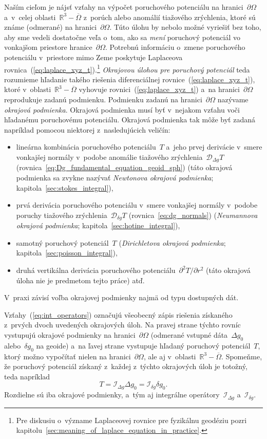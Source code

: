 \documentclass[a4paper, 12pt]{book}
\newcommand{\DIFF}{\mathcal D}
\newcommand{\INT}{\mathcal I}
\begin{document}
Naším cieľom je nájsť vzťahy na výpočet poruchového potenciálu na 
hranici~$\partial \Omega$ a~v~celej oblasti~$\mathbb{R}^3 - \overline{\Omega}$ 
z~porúch alebo anomálií tiažového zrýchlenia, ktoré sú známe (odmerané) na 
hranici~$\partial \Omega$.  Túto úlohu by nebolo možné vyriešiť bez toho, aby 
sme vedeli dostatočne veľa o~tom, ako sa \emph{mení} poruchový potenciál vo 
vonkajšom priestore hranice~$\partial\Omega$.  Potrebnú informáciu o~zmene 
poruchového potenciálu v~priestore mimo Zeme poskytuje Laplaceova 
rovnica~(\ref{eq:laplace_xyz_t}).\footnote{Pre diskusiu o~význame Laplaceovej 
rovnice pre fyzikálnu geodéziu pozri 
kapitolu~\ref{sec:meaning_of_laplace_equation_in_practice}.}  \emph{Okrajovou 
úlohou pre poruchový potenciál} teda rozumieme hľadanie takého riešenia 
diferenciálnej rovnice~(\ref{eq:laplace_xyz_t}), ktoré v~oblasti~$\mathbb{R}^3 
- \overline\Omega$ vyhovuje rovnici~(\ref{eq:laplace_xyz_t}) a~na 
hranici~$\partial \Omega$ reprodukuje zadanú podmienku.  Podmienku zadanú na 
hranici~$\partial \Omega$ nazývame \emph{okrajová podmienka}.  Okrajová 
podmienka musí byť v~nejakom vzťahu voči hľadanému poruchovému potenciálu.  
Okrajová podmienka tak môže byť zadaná napríklad pomocou niektorej 
z~nasledujúcich veličín:
%
\begin{itemize}
\item lineárna kombinácia poruchového potenciálu~$T$ a~jeho prvej derivácie 
v~smere vonkajšej normály v~podobe anomálie tiažového zrýchlenia~$\DIFF_{\Delta 
g}T$ (rovnica~\ref{eq:Dg_fundamental_equation_geoid_sph}) (táto okrajová 
podmienka sa zvykne nazývať \emph{Newtonova okrajová podmienka}; 
kapitola~\ref{sec:stokes_integral}),
%
\item prvá derivácia poruchového potenciálu v~smere vonkajšej normály v~podobe 
poruchy tiažového zrýchlenia~$\DIFF_{\delta g} T$ (rovnica~\ref{eq:dg_normals}) 
(\emph{Neumannova okrajová podmienka}; kapitola~\ref{sec:hotine_integral}),
%
\item samotný poruchový potenciál~$T$ (\emph{Dirichletova okrajová podmienka}; 
kapitola~\ref{sec:poisson_integral}),
%
\item druhá vertikálna derivácia poruchového potenciálu~$\partial^2 
T / \partial r^2$ (táto okrajová úloha nie je predmetom tejto práce) atď.
\end{itemize}
%
V~praxi závisí voľba okrajovej podmienky najmä od typu dostupných dát.

Vzťahy~(\ref{eq:int_operators}) označujú všeobecný zápis riešenia získaného 
z~prvých dvoch uvedených okrajových úloh.  Na pravej strane týchto rovníc 
vystupujú okrajové podmienky na hranici~$\partial \Omega$ (odmerané vstupné 
dáta~$\Delta g_0$ alebo~$\delta g_0$ na geoide) a~na ľavej strane vystupuje 
hľadaný poruchový potenciál~$T$, ktorý možno vypočítať nielen na 
hranici~$\partial\Omega$, ale aj v~oblasti~$\mathbb{R}^3 - \overline\Omega$.  
Spomeňme, že poruchový potenciál získaný z~každej z~týchto okrajových úloh je 
totožný, teda napríklad
%
\begin{equation}
T = \INT_{\Delta g} \Delta g_0 = \INT_{\delta g}\delta g_0{.}
\end{equation}
%
Rozdielne sú iba okrajové podmienky, a~tým aj integrálne 
operátory~$\INT_{\Delta g}$ a~$\INT_{\delta g}$.
\end{document}

